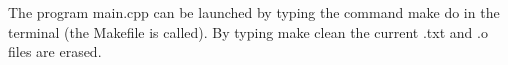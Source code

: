 \documentclass[10pt]{article}
\begin{document}
	The program main.cpp can be launched by typing the command {\ttfamily make do} in the terminal (the {\ttfamily Makefile} is called). By typing {\ttfamily make clean} the current .txt and .o files are erased.
	
	\begin{figure}[h]
	\end{figure}
	
\end{document}
